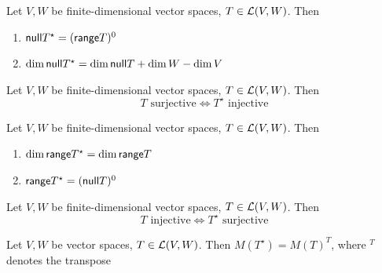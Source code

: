 \documentclass[aspectratio=169]{beamer}
\begin{document}
\begin{frame}
\begin{theorem}
Let $V,W$ be finite-dimensional vector spaces, $T\in\mathcal{L}(V,W)$. Then
\begin{enumerate}
\item $\mathsf{null} T^\star=(\mathsf{range} T)^0$
\item $\dim\mathsf{null} T^\star =\dim\mathsf{null} T+\dim W-\dim V$
\end{enumerate}
\end{theorem}
\vfill
\begin{importanttheorem}
Let $V,W$ be finite-dimensional vector spaces, $T\in\mathcal{L}(V,W)$. Then
\[
T\textrm{ surjective}\Leftrightarrow T^\star\textrm{ injective}
\]
\end{importanttheorem}
\end{frame}


\begin{frame}
\begin{theorem}
Let $V,W$ be finite-dimensional vector spaces, $T\in\mathcal{L}(V,W)$. Then
\begin{enumerate}
\item $\dim\mathsf{range} T^\star=\dim\mathsf{range} T$
\item $\mathsf{range} T^\star=(\mathsf{null} T)^0$
\end{enumerate}
\end{theorem}
\vfill
\begin{theorem}
Let $V,W$ be finite-dimensional vector spaces, $T\in\mathcal{L}(V,W)$. Then
\[
T\textrm{ injective}\Leftrightarrow T^\star\textrm{ surjective}
\]
\end{theorem}
\end{frame}

\begin{frame}
\begin{theorem}
Let $V,W$ be vector spaces, $T\in\mathcal{L}(V,W)$. Then $M(T^\star)=M(T)^T$, where $^T$ denotes the transpose
\end{theorem}
\end{frame}


\end{document}
